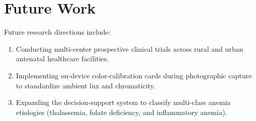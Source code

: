 \documentclass[journal,10pt,twocolumn]{IEEEtran}
\begin{document}
\section{Future Work}
Future research directions include:
\begin{enumerate}
    \item Conducting multi-center prospective clinical trials across rural and urban antenatal healthcare facilities.
    \item Implementing on-device color-calibration cards during photographic capture to standardize ambient lux and chromaticity.
    \item Expanding the decision-support system to classify multi-class anemia etiologies (thalassemia, folate deficiency, and inflammatory anemia).
\end{enumerate}



\end{document}
